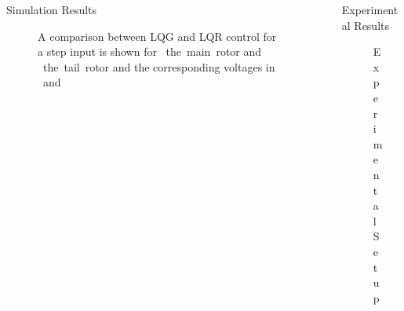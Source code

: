 \documentclass[final]{beamer}
\newlength{\sepwid}
\newlength{\onecolwid}
\begin{document}
\begin{frame}[t]
\begin{columns}[t]
\begin{column}{\onecolwid}
\begin{block}{Simulation Results}
\begin{figure}
    \centering
    \subfigure[][]{
    \label{fig:simStepPitch}
    }
    \subfigure[][]{
    \label{fig:simStepYaw}
    }
    \subfigure[][]{
    \label{fig:simPitchVolt}
    }
    \subfigure[][]{
    \label{fig:simYawVolt}
    }
    \caption{A comparison between LQG and LQR control for a step input is shown for ~the~main~rotor and ~the~tail~rotor and the corresponding voltages in ~and~}
    \label{fig:simResults}
\end{figure}
\vskip -2cm
\end{block}


\end{column} %

\begin{column}{\sepwid}\end{column}

\begin{column}{\onecolwid} %


\begin{block}{Experimental Results}
\vskip -1cm
\begin{figure}
    \centering
    \caption{Experimental Setup}
    \label{fig:Setup}
\end{figure}


\end{block}
\end{column}
\end{columns}
\end{frame}
\end{document}
